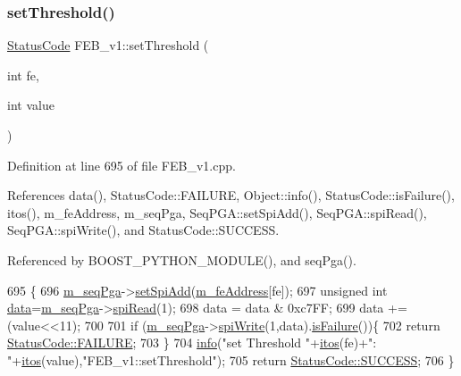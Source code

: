 \subsubsection{\texorpdfstring{set\+Threshold()}{setThreshold()}}
{\footnotesize\ttfamily \hyperlink{classStatusCode}{Status\+Code} F\+E\+B\+\_\+v1\+::set\+Threshold (\begin{DoxyParamCaption}\item[{int}]{fe,  }\item[{int}]{value }\end{DoxyParamCaption})}



Definition at line 695 of file F\+E\+B\+\_\+v1.\+cpp.



References data(), Status\+Code\+::\+F\+A\+I\+L\+U\+RE, Object\+::info(), Status\+Code\+::is\+Failure(), itos(), m\+\_\+fe\+Address, m\+\_\+seq\+Pga, Seq\+P\+G\+A\+::set\+Spi\+Add(), Seq\+P\+G\+A\+::spi\+Read(), Seq\+P\+G\+A\+::spi\+Write(), and Status\+Code\+::\+S\+U\+C\+C\+E\+SS.



Referenced by B\+O\+O\+S\+T\+\_\+\+P\+Y\+T\+H\+O\+N\+\_\+\+M\+O\+D\+U\+L\+E(), and seq\+Pga().


\begin{DoxyCode}
695                                                   \{
696   \hyperlink{classFEB__v1_a6c7804ac86796f233a8393043adf2e77}{m\_seqPga}->\hyperlink{classSeqPGA_ac998ce3a6d9b5f2e88cc8393f8c1df53}{setSpiAdd}(\hyperlink{classFEB__v1_a4e1945c2d5b434125f375e9d0fc6d99f}{m\_feAddress}[fe]);
697   \textcolor{keywordtype}{unsigned} \textcolor{keywordtype}{int} \hyperlink{classFEB__v1_a6bca4320bd3bbbc32efc81097f33421a}{data}=\hyperlink{classFEB__v1_a6c7804ac86796f233a8393043adf2e77}{m\_seqPga}->\hyperlink{classSeqPGA_ab3d0e5e5d4014bc7a92588a76b8713d4}{spiRead}(1);
698   data = data & 0xc7FF;
699   data += (value<<11);
700   
701   \textcolor{keywordflow}{if} (\hyperlink{classFEB__v1_a6c7804ac86796f233a8393043adf2e77}{m\_seqPga}->\hyperlink{classSeqPGA_ad4421841ce4ce8b88ad13f63216f0743}{spiWrite}(1,data).\hyperlink{classStatusCode_a5dd22dc6eb2c52fc4cabc58f6dea2eb7}{isFailure}())\{
702     \textcolor{keywordflow}{return} \hyperlink{classStatusCode_a6f565cbeadc76d14c72f047e5e85eb4ba3da73d4c469762eb9d3c960368252b26}{StatusCode::FAILURE};
703   \}
704   \hyperlink{classObject_a644fd329ea4cb85f54fa6846484b84a8}{info}(\textcolor{stringliteral}{"set Threshold "}+\hyperlink{Tools_8h_af330027dbdafb9a30768b3613c553e60}{itos}(fe)+\textcolor{stringliteral}{": "}+\hyperlink{Tools_8h_af330027dbdafb9a30768b3613c553e60}{itos}(value),\textcolor{stringliteral}{"FEB\_v1::setThreshold"});
705   \textcolor{keywordflow}{return} \hyperlink{classStatusCode_a6f565cbeadc76d14c72f047e5e85eb4badd0da38d3ba0d922efd1f4619bc37ad8}{StatusCode::SUCCESS};
706 \}
\end{DoxyCode}
\mbox{\label{classFEB__v1_a76d86fb9e9be48e704257070675ae1cc}} 
